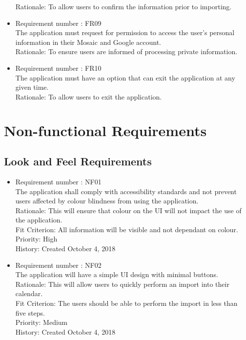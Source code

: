 \documentclass[12pt, titlepage]{article}
\begin{document}
\begin{itemize}
Rationale: To allow users to confirm the information prior to importing.
\item Requirement number : FR09\\
The application must request for permission to access the user's personal information in their Mosaic and Google account. \\
Rationale: To ensure users are informed of processing private information.
\item Requirement number : FR10\\
The application must have an option that can exit the application at any given time.\\
Rationale: To  allow users to exit the application.

\end{itemize}

\section{Non-functional Requirements}

\subsection{Look and Feel Requirements}
\begin{itemize}
\item Requirement number : NF01\\
The application shall comply with accessibility standards and not prevent users affected by colour blindness from using the application.\\
Rationale: This will ensure that colour on the UI will not impact the use of the application.\\
Fit Criterion: All information will be visible and not dependant on colour.\\
Priority: High\\
History: Created October 4, 2018

\item Requirement number : NF02 \\
The application will have a simple UI design with minimal buttons.\\
Rationale: This will allow users to quickly perform an import into their calendar.\\
Fit Criterion: The users should be able to perform the import in less than five steps.\\
Priority: Medium\\
History: Created October 4, 2018

\end{itemize}
\end{document}

